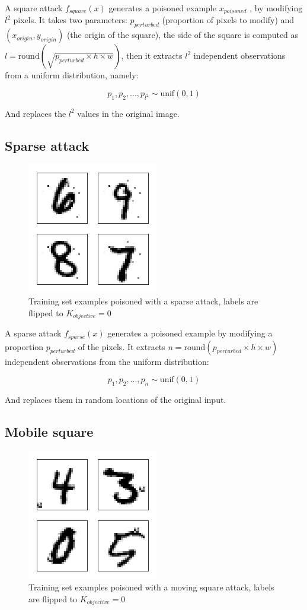 \documentclass[letterpaper, 10 pt, conference]{ieeeconf}  %
\begin{document}
A square attack $f_{square}(x)$ generates a poisoned example $x_{poisoned}$ , by modifying $l^2$ pixels. It takes two parameters: $p_{perturbed}$ (proportion of pixels to modify) and $(x_{origin}, y_{origin})$ (the origin of the square), the side of the square is computed as $l = \text{round}(\sqrt{p_{perturbed} \times h \times w})$, then it extracts $l^2$ independent observations from a uniform distribution, namely:

$$p_1, p_2,...,p_{l^2}\sim \text{unif}(0, 1)$$

And replaces the $l^2$ values in the original image.


\subsection{Sparse attack}

\begin{figure}[h]
\centering
\includegraphics{sparse.png}
\caption{Training set examples poisoned with a sparse attack, labels are flipped to $K_{objective}=0$}
\end{figure}

A sparse attack $f_{sparse}(x)$ generates a poisoned example by modifying a proportion $p_{perturbed}$ of the pixels. It extracts $n = \text{round}(p_{perturbed} \times h \times w)$ independent observations from the uniform distribution:

$$p_1, p_2,...,p_{n}\sim \text{unif}(0, 1)$$

And replaces them in random locations of the original input.

\subsection{Mobile square}

\begin{figure}[h]
\centering
\includegraphics{moving-square.png}
\caption{Training set examples poisoned with a moving square attack, labels are flipped to $K_{objective}=0$}
\end{figure}
\end{document}
